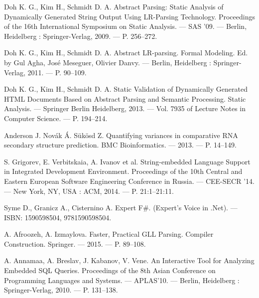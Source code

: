 \begin{thebibliography}{99}

  Doh K. G., Kim H., Schmidt D. A. 
  Abstract Parsing: Static Analysis of Dynamically Generated String Output Using LR-Parsing Technology. 
  Proceedings of the 16th International Symposium on Static Analysis. –– SAS ’09. –– Berlin, Heidelberg : Springer-Verlag, 2009. –– P. 256–272.

  Doh K. G., Kim H., Schmidt D. A. 
  Abstract LR-parsing. 
  Formal Modeling. Ed. by Gul Agha, José Meseguer, Olivier Danvy. –– Berlin, Heidelberg : Springer-Verlag, 2011. –– P. 90–109.

  Doh K. G., Kim H., Schmidt D. A. 
  Static Validation of Dynamically Generated HTML Documents Based on Abstract Parsing and Semantic Processing.
  Static Analysis. –– Springer Berlin Heidelberg, 2013. –– Vol. 7935 of Lecture Notes in Computer Science. –– P. 194–214.
                                                                                                                         
  Anderson J. Nov{\'a}k {\'A}. Sükösd Z. 
  Quantifying variances in comparative RNA secondary structure prediction.
  BMC Bioinformatics. –– 2013. –– P. 14–149. 

  S. Grigorev, E. Verbitskaia, A. Ivanov et al.
  String-embedded Language Support in Integrated Development Environment.
  Proceedings of the 10th Central and Eastern European Software Engineering Conference in Russia. –– CEE-SECR ’14. –– New York, NY, USA : ACM, 2014. –– P. 21:1–21:11.

                                                                                                                                                          
  Syme D., Granicz A., Cisternino A. 
  Expert F\#.
  (Expert’s Voice in .Net). –– ISBN: 1590598504, 9781590598504.

  A. Afroozeh, A. Izmaylova.
  Faster, Practical GLL Parsing.
  Compiler Construction. Springer. — 2015. — P. 89–108.                                                                                                   

  A. Annamaa, A. Breslav, J. Kabanov, V. Vene.
  An Interactive Tool for Analyzing Embedded SQL Queries.
  Proceedings of the 8th Asian Conference on Programming Languages and Systems. –– APLAS’10. –– Berlin, Heidelberg : Springer-Verlag, 2010. –– P. 131–138.


\end{thebibliography}
